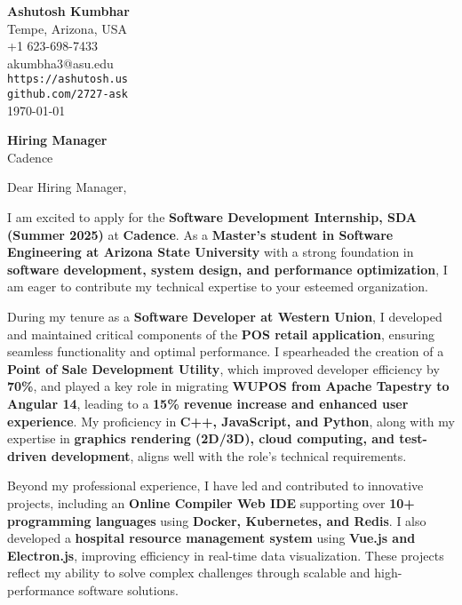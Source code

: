 \documentclass[11pt]{article}
\begin{document}
\begin{flushleft}
\textbf{Ashutosh Kumbhar} \\
Tempe, Arizona, USA \\
+1 623-698-7433 \\
akumbha3@asu.edu \\
\texttt{https://ashutosh.us} \\
\texttt{github.com/2727-ask} \\
\today
\end{flushleft}

\vspace{0.5em}

\textbf{Hiring Manager} \\
Cadence \\

\vspace{1em}

Dear Hiring Manager,

I am excited to apply for the \textbf{Software Development Internship, SDA (Summer 2025)} at \textbf{Cadence}. As a \textbf{Master’s student in Software Engineering at Arizona State University} with a strong foundation in \textbf{software development, system design, and performance optimization}, I am eager to contribute my technical expertise to your esteemed organization.

During my tenure as a \textbf{Software Developer at Western Union}, I developed and maintained critical components of the \textbf{POS retail application}, ensuring seamless functionality and optimal performance. I spearheaded the creation of a \textbf{Point of Sale Development Utility}, which improved developer efficiency by \textbf{70\%}, and played a key role in migrating \textbf{WUPOS from Apache Tapestry to Angular 14}, leading to a \textbf{15\% revenue increase and enhanced user experience}. My proficiency in \textbf{C++, JavaScript, and Python}, along with my expertise in \textbf{graphics rendering (2D/3D), cloud computing, and test-driven development}, aligns well with the role's technical requirements.

Beyond my professional experience, I have led and contributed to innovative projects, including an \textbf{Online Compiler Web IDE} supporting over \textbf{10+ programming languages} using \textbf{Docker, Kubernetes, and Redis}. I also developed a \textbf{hospital resource management system} using \textbf{Vue.js and Electron.js}, improving efficiency in real-time data visualization. These projects reflect my ability to solve complex challenges through scalable and high-performance software solutions.
\end{document}
